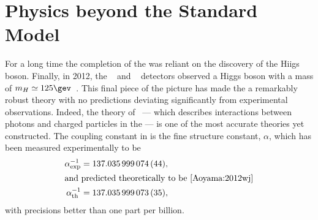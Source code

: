 \section{Physics beyond the Standard Model}
\label{sec:bsm}

For a long time the completion of the \sm was reliant on the discovery of the Hiigs boson.
Finally, in 2012, the \cms~\cite{Chatrchyan:2008aa} and \atlas~\cite{Aad:2008zzm} detectors
observed a Higgs boson with a mass of $m_H\simeq125\gev$~\cite{Chatrchyan:2012ufa,Aad:2012tfa}.
This final piece of the picture has made the \sm a remarkably robust theory with no predictions
deviating significantly from experimental observations.
Indeed, the theory of \QED~--- which describes interactions between
photons and charged particles in the \sm --- is one of the most accurate theories yet constructed.
The coupling constant in \QED is the fine structure constant, $\alpha$, which has been measured
experimentally to be~\cite{PDG2012}
\begin{align}
  \alpha^{-1}_\mathrm{exp} &= 137.035\,999\,074\,(44), \nonumber\\
  \intertext{and predicted theoretically to be~\cite{Aoyama:2012wj}}
  \alpha^{-1}_\mathrm{th} &= 137.035\,999\,073\,(35), \nonumber
\end{align}
with precisions better than one part per billion.




